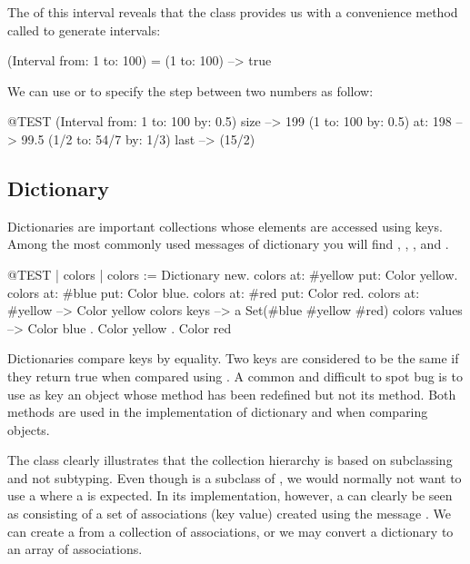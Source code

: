\documentclass[a4paper,10pt,twoside]{book}
\begin{document}
\noindent
The  of this interval reveals that the class  provides us with a convenience method called  to generate intervals:

\begin{code}{}
(Interval from: 1 to: 100) = (1 to: 100) --> true
\end{code}

We can use  or  to specify the step between two numbers as follow:

\begin{code}{@TEST}
(Interval from: 1 to: 100 by: 0.5) size --> 199
(1 to: 100 by: 0.5) at: 198 --> 99.5
(1/2 to: 54/7 by: 1/3) last --> (15/2)
\end{code}

\subsection{Dictionary}
Dictionaries are important collections whose elements are accessed using keys. 
Among the most commonly used messages of dictionary you will find , , ,  and .

\begin{code}{@TEST | colors |}
colors := Dictionary new.
colors at: #yellow put: Color yellow.
colors at: #blue put: Color blue.
colors at: #red put: Color red.
colors at: #yellow --> Color yellow
colors keys          --> a Set(#blue #yellow #red)
colors values       --> {Color blue . Color yellow . Color red}
\end{code}

Dictionaries compare keys by equality. Two keys are considered to be the same if they return true when compared using \ct{=}. A common and difficult to spot bug is to use as key an object whose \ct{=} method has been redefined but not its  method. Both methods are used in the implementation of dictionary and when comparing objects.

The class  clearly illustrates that the collection hierarchy is based on subclassing and not subtyping.  Even though  is a subclass of , we would normally not want to use a  where a  is expected. In its implementation, however, a  can clearly be seen as consisting of a set of associations (key value) created using the message . We can create a  from a collection of associations, or we may convert a dictionary to an array of associations.
\end{document}
